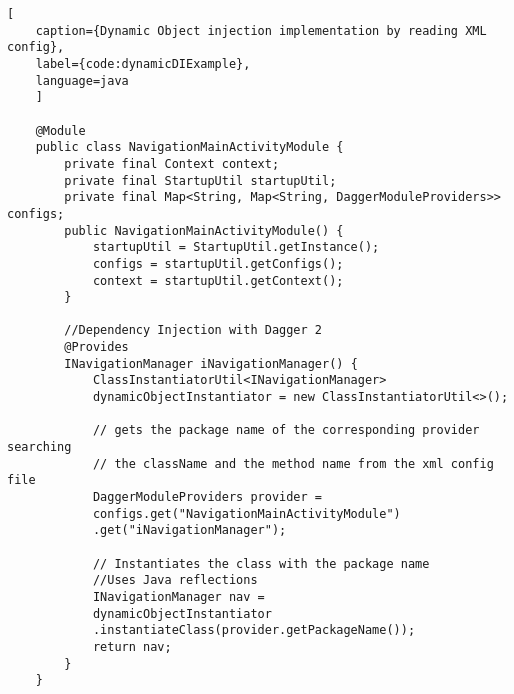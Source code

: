    \newpage
   \begin{lstlisting}[
    caption={Dynamic Object injection implementation by reading XML config},
    label={code:dynamicDIExample},
    language=java
    ]

    @Module
    public class NavigationMainActivityModule {
        private final Context context;
        private final StartupUtil startupUtil;
        private final Map<String, Map<String, DaggerModuleProviders>> configs;
        public NavigationMainActivityModule() {
            startupUtil = StartupUtil.getInstance();
            configs = startupUtil.getConfigs();
            context = startupUtil.getContext();
        }

        //Dependency Injection with Dagger 2
        @Provides
        INavigationManager iNavigationManager() {
            ClassInstantiatorUtil<INavigationManager> 
            dynamicObjectInstantiator = new ClassInstantiatorUtil<>();

            // gets the package name of the corresponding provider searching
            // the className and the method name from the xml config file  
            DaggerModuleProviders provider = 
            configs.get("NavigationMainActivityModule")
            .get("iNavigationManager");

            // Instantiates the class with the package name
            //Uses Java reflections
            INavigationManager nav = 
            dynamicObjectInstantiator
            .instantiateClass(provider.getPackageName());
            return nav;
        }
    }
   \end{lstlisting}
   
    
